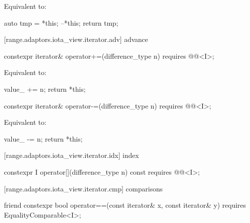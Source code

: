 \begin{itemdescr}
\pnum
\effects Equivalent to:
\begin{codeblock}
auto tmp = *this;
--*this;
return tmp;
\end{codeblock}
\end{itemdescr}

[range.adaptors.iota_view.iterator.adv]{ advance}

\begin{itemdecl}
constexpr iterator& operator+=(difference_type n)
  requires @@<I>;
\end{itemdecl}

\begin{itemdescr}
\pnum
\effects Equivalent to:
\begin{codeblock}
value_ += n;
return *this;
\end{codeblock}
\end{itemdescr}

\begin{itemdecl}
constexpr iterator& operator-=(difference_type n)
  requires @@<I>;
\end{itemdecl}

\begin{itemdescr}
\pnum
\effects Equivalent to:
\begin{codeblock}
value_ -= n;
return *this;
\end{codeblock}
\end{itemdescr}

[range.adaptors.iota_view.iterator.idx]{ index}

\begin{itemdecl}
constexpr I operator[](difference_type n) const
  requires @@<I>;
\end{itemdecl}

\begin{itemdescr}
\pnum
\oldtxt{\returns} 
\end{itemdescr}

[range.adaptors.iota_view.iterator.cmp]{ comparisons}

\begin{itemdecl}
friend constexpr bool operator==(const iterator& x, const iterator& y)
  requires EqualityComparable<I>;
\end{itemdecl}

